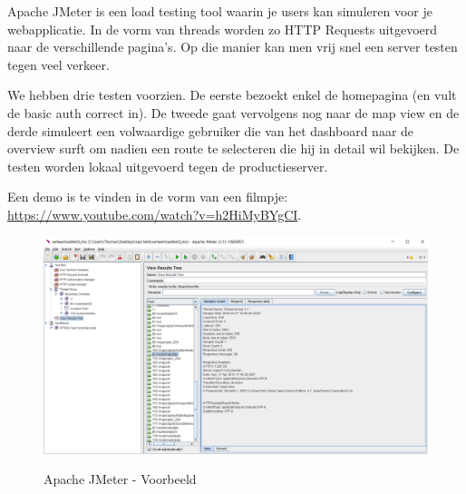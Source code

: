 Apache JMeter is een load testing tool waarin je users kan simuleren voor je webapplicatie. In de vorm van threads worden zo HTTP Requests uitgevoerd naar de verschillende pagina's. Op die manier kan men vrij snel een server testen tegen veel verkeer.

We hebben drie testen voorzien. De eerste bezoekt enkel de homepagina (en vult de basic auth correct in). De tweede gaat vervolgens nog naar de map view en de derde simuleert een volwaardige gebruiker die van het dashboard naar de overview surft om nadien een route te selecteren die hij in detail wil bekijken. De testen worden lokaal uitgevoerd tegen de productieserver. 

Een demo is te vinden in de vorm van een filmpje: \url{https://www.youtube.com/watch?v=h2HiMyBYgCI}.


\begin{figure}[H]
\centering
\includegraphics[width=\textwidth]{images/jmeterexample.png}\\
\caption{Apache JMeter - Voorbeeld}
\end{figure}








